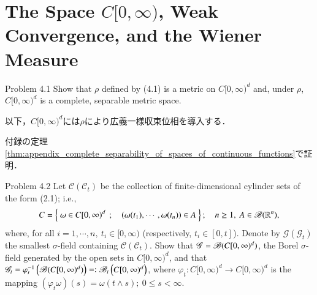 \section{The Space $C[0,\infty)$, Weak Convergence, and the Wiener Measure}
	\begin{itembox}[l]{Problem 4.1}
		Show that $\rho$ defined by (4.1) is a metric on $C[0,\infty)^d$ and, under $\rho$, 
		$C[0,\infty)^d$ is a complete, separable metric space.
	\end{itembox}
	以下，$C[0,\infty)^d$には$\rho$により広義一様収束位相を導入する．
	
	\begin{prf}
		付録の定理\ref{thm:appendix_complete_separability_of_spaces_of_continuous_functions}で証明．
		\QED
	\end{prf}

\begin{itembox}[l]{Problem 4.2}
	Let $\mathscr{C}(\mathscr{C}_t)$ be the collection of finite-dimensional cylinder sets of the form (2.1); i.e.,
	\begin{align}
		C = \left\{\ \omega \in C[0,\infty)^d\ \, ; \quad (\omega(t_1),\cdots,\omega(t_n)) \in A\ \right\};
		\quad n \geq 1,\ A \in \mathscr{B}(\mathbb{R}^n),
	\end{align}
	where, for all $i=1,\cdots,n,\ t_i \in [0,\infty)$ (respectively, $t_i \in [0,t]$).
	Denote by $\mathscr{G}(\mathscr{G}_t)$ the smallest $\sigma$-field containing $\mathscr{C}(\mathscr{C}_t)$.
	Show that $\mathscr{G} = \mathscr{B}(C[0,\infty)^d)$, the Borel $\sigma$-field generated by the open sets in
	$C[0,\infty)^d$, and that $\mathscr{G}_t = \varphi_t^{-1}\left( \mathscr{B}(C[0,\infty)^d) \right) =\mathrel{\mathop:}
	\mathscr{B}_t\left( C[0,\infty)^d \right)$, where $\varphi_t:C[0,\infty)^d \longrightarrow C[0,\infty)^d$ is the
	mapping $(\varphi_t\omega)(s) = \omega(t \wedge s);\ 0 \leq s < \infty$.
\end{itembox}

